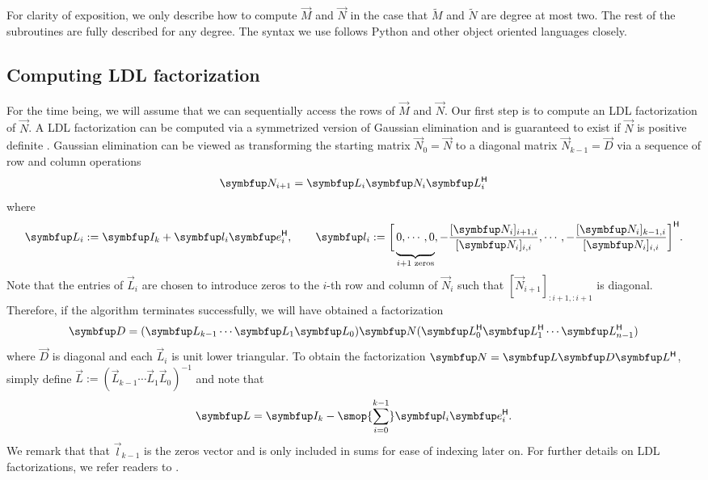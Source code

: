 For clarity of exposition, we only describe how to compute $\vec{M}$ and $\vec{N}$ in the case that $\tilde{M}$ and $\tilde{N}$ are degree at most two.
The rest of the subroutines are fully described for any degree.
The syntax we use follows Python and other object oriented languages closely.



\subsection{Computing LDL factorization}

For the time being, we will assume that we can sequentially access the rows of $\vec{M}$ and $\vec{N}$.
Our first step is to compute an LDL factorization of $\vec{N}$.
A LDL factorization can be computed via a symmetrized version of Gaussian elimination and is guaranteed to exist if \( \vec{N} \) is positive definite \cite{higham_02}.
Gaussian elimination can be viewed as transforming the starting matrix \( \vec{N}_0 = \vec{N} \) to a diagonal matrix \( \vec{N}_{k-1} = \vec{D} \) via a sequence of row and column operations
\begin{equation*}
    \vec{N}_{i+1} = \vec{L}_i \vec{N}_i \vec{L}_i^\cT
\end{equation*}
where
\begin{equation*}
    \vec{L}_i := 
    \vec{I}_k + \vec{l}_i\vec{e}_i^\cT
    ,\qquad
    \vec{l}_i := 
        \bigg[ \underbrace{\vphantom{\bigg|}0 , \cdots , 0}_{i+1\text{ zeros}} , -\frac{[\vec{N}_{i}]_{i+1,i}}{[\vec{N}_i]_{i,i}}  , \cdots , -\frac{[\vec{N}_i]_{k-1,i}}{[\vec{N}_i]_{i,i}}  \bigg]^\cT.
\end{equation*}
Note that the entries of \( \vec{L}_i \) are chosen to introduce zeros to the \( i \)-th row and column of \( \vec{N}_i \) such that \( [\vec{N}_{i+1}]_{:i+1,:i+1} \) is diagonal.
Therefore, if the algorithm terminates successfully, we will have obtained a factorization 
\begin{equation*}
    \vec{D} = (\vec{L}_{k-1} \cdots \vec{L}_1 \vec{L}_0) \vec{N} (\vec{L}_0^\cT \vec{L}_1^\cT \cdots \vec{L}_{n-1}^\cT)
\end{equation*}
where \( \vec{D} \) is diagonal and each \( \vec{L}_i \) is unit lower triangular.
To obtain the factorization \( \vec{N} = \vec{L} \vec{D} \vec{L}^\cT \), simply define  \( \vec{L} := (\vec{L}_{k-1} \cdots \vec{L}_1 \vec{L}_0)^{-1} \) and note that 
\begin{equation*}
    \vec{L} = \vec{I}_k - \smop{\sum_{i=0}^{k-1}} \vec{l}_i \vec{e}_i^\cT.
\end{equation*}
We remark that that $\vec{l}_{k-1}$ is the zeros vector and is only included in sums for ease of indexing later on. 
For further details on LDL factorizations, we refer readers to \cite{higham_02}.

